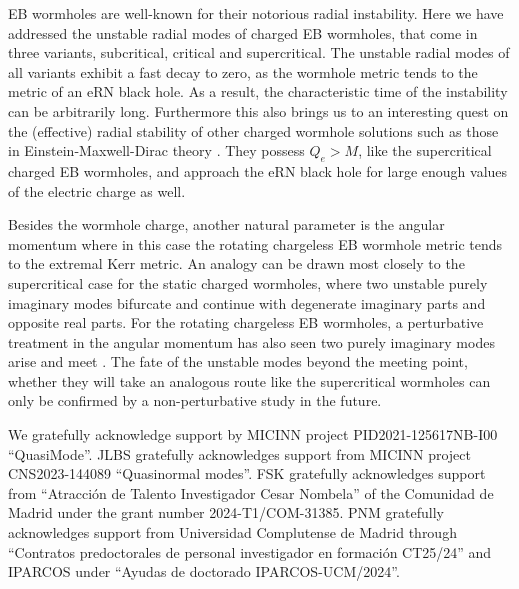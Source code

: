 \documentclass[floats,floatfix,showpacs,amssymb,prd,superscriptaddress,nofootinbib,nolongbibliography,reprint]{revtex4-2}
\newcommand\prlsec[1]{\vspace{2mm}\noindent {\textbf{  \textit{#1}}}}
\begin{document}
\prlsec{Conclusions.}
EB wormholes are well-known for their notorious radial instability.
Here we have addressed the unstable radial modes of charged EB wormholes, that come in three variants, subcritical, critical and supercritical.
The unstable radial modes of all variants exhibit a fast decay to zero, as the wormhole metric tends to the metric of an eRN black hole.
{
As a result, the characteristic time of the instability can be arbitrarily long.
}
Furthermore this also brings us to an interesting quest on the (effective) 
{
radial
}
stability of other charged wormhole solutions such as those in Einstein-Maxwell-Dirac theory \cite{Blazquez-Salcedo:2020czn,Konoplya:2021hsm,Blazquez-Salcedo:2021udn}. 
They possess $Q_e>M$, like the supercritical charged EB wormholes, and approach the eRN black hole for large enough values of the electric charge as well.

Besides the wormhole charge, another natural parameter is the angular momentum where in this case the rotating chargeless EB wormhole metric tends to the extremal Kerr metric.
An analogy can be drawn most closely to the
supercritical case for the static charged wormholes, where two unstable purely imaginary modes bifurcate and continue with degenerate imaginary parts and opposite real parts.
For the rotating chargeless EB wormholes,
a perturbative treatment in the angular momentum has also seen two purely imaginary modes arise and meet \cite{Azad:2023iju,Azad:2024axu}. 
The fate of the unstable modes beyond the meeting point, whether they will take an analogous route like the supercritical wormholes can only be confirmed by a non-perturbative study in the future.






\prlsec{Acknowledgment.}
%
We gratefully acknowledge support by MICINN project PID2021-125617NB-I00 ``QuasiMode''.
JLBS gratefully acknowledges support from MICINN project CNS2023-144089 ``Quasinormal modes''.
FSK gratefully acknowledges support from ``Atracci\'on de Talento Investigador Cesar Nombela'' of the Comunidad de Madrid under the grant number 2024-T1/COM-31385.
PNM gratefully acknowledges support from Universidad Complutense de Madrid through ``Contratos predoctorales
de personal investigador en formación CT25/24'' and IPARCOS under ``Ayudas de doctorado IPARCOS-UCM/2024''.
\end{document}
